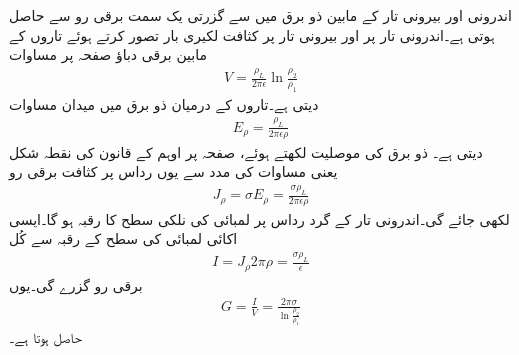 اندرونی اور بیرونی تار کے مابین ذو برق میں سے گزرتی یک سمت برقی رو  سے حاصل ہوتی ہے۔اندرونی تار پر  اور بیرونی تار پر  کثافت لکیری بار تصور کرتے ہوئے تاروں کے مابین برقی دباؤ صفحہ  پر مساوات 
\begin{align*}
V=\frac{\rho_L}{2\pi \epsilon} \ln \frac{\rho_2}{\rho_1}
\end{align*}
دیتی ہے۔تاروں کے درمیان ذو برق میں میدان مساوات 
\begin{align*}
E_{\rho}=\frac{\rho_L}{2\pi \epsilon \rho}
\end{align*}
دیتی ہے۔ ذو برق کی موصلیت  لکھتے ہوئے، صفحہ  پر اوہم کے قانون کی نقطہ شکل یعنی مساوات  کی مدد سے یوں رداس  پر کثافت  برقی رو
\begin{align*}
J_{\rho}=\sigma E_{\rho}=\frac{\sigma \rho_L}{2\pi \epsilon \rho}
\end{align*}
لکھی جائے گی۔اندرونی تار کے گرد رداس  پر  لمبائی کی نلکی سطح کا رقبہ  ہو گا۔ایسی اکائی لمبائی کی سطح کے رقبہ 
  سے کُل
\begin{align*}
I= J_{\rho} 2\pi \rho=\frac{\sigma \rho_L}{\epsilon}
\end{align*}
برقی رو گزرے گی۔یوں
\begin{align}
G=\frac{I}{V}=\frac{2\pi \sigma}{\ln \frac{\rho_2}{\rho_1}}
\end{align}
حاصل ہوتا ہے۔

